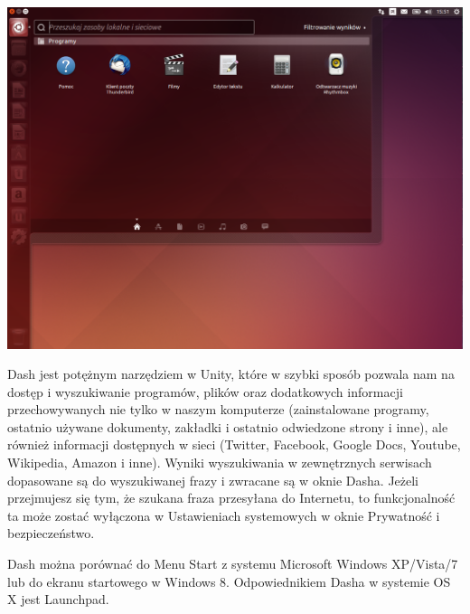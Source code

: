 \begin{center}
	\includegraphics[width=\linewidth]{images/unity_pulpit_dash.png}
\end{center}

Dash jest potężnym narzędziem w Unity, które w szybki sposób pozwala nam na dostęp i wyszukiwanie programów, plików oraz dodatkowych informacji przechowywanych nie tylko w naszym komputerze (zainstalowane programy, ostatnio używane dokumenty, zakładki i ostatnio odwiedzone strony i inne), ale również informacji dostępnych w sieci (Twitter, Facebook, Google Docs, Youtube, Wikipedia, Amazon i inne). Wyniki wyszukiwania w zewnętrznych serwisach dopasowane są do wyszukiwanej frazy i zwracane są w oknie Dasha. Jeżeli przejmujesz się tym, że szukana fraza przesyłana do Internetu, to funkcjonalność ta może zostać wyłączona w Ustawieniach systemowych w oknie \textcolor{ubuntu_orange}{Prywatność i bezpieczeństwo.}

Dash można porównać do Menu Start z systemu Microsoft Windows XP/Vista/7 lub do ekranu startowego w Windows 8. Odpowiednikiem Dasha w systemie OS X jest Launchpad.

